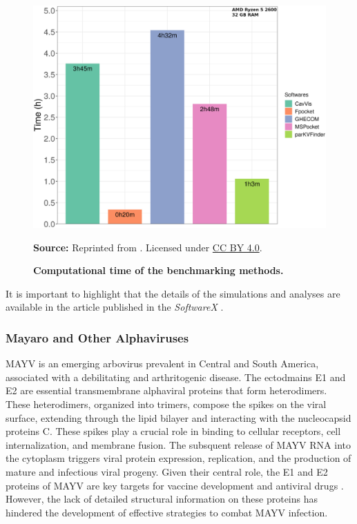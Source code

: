 \documentclass[Ingles]{phdthesis}
\begin{document}
\begin{figure}[H]
  \centerline{\includegraphics[scale=0.9]{images/hiv1-protease-dm-times.png}}
  \centerline{\tiny{\textbf{Source:} Reprinted from \cite{guerra2020}. Licensed under \href{https://creativecommons.org/licenses/by/4.0/}{CC BY 4.0}.}}
  \caption[Computational time of the benchmarking methods]{\textbf{Computational time of the benchmarking methods.}}
  \label{fig:hiv1-protease-dm-times}
\end{figure}

It is important to highlight that the details of the simulations and analyses are available in the article published in the \textit{SoftwareX} \cite{guerra2020}.

\subsubsection{Mayaro and Other Alphaviruses \label{sec:parkvfinder-mayaro}}

\ac{MAYV} is an emerging arbovirus prevalent in Central and South America, associated with a debilitating and arthritogenic disease. The ectodmains E1 and E2 are essential transmembrane alphaviral proteins that form heterodimers. These heterodimers, organized into trimers, compose the spikes on the viral surface, extending through the lipid bilayer and interacting with the nucleocapsid proteins C. These spikes play a crucial role in binding to cellular receptors, cell internalization, and membrane fusion. The subsquent release of \acs{MAYV} RNA into the cytoplasm triggers viral protein expression, replication, and the production of mature and infectious viral progeny. Given their central role, the E1 and E2 proteins of \acs{MAYV} are key targets for vaccine development and antiviral drugs \cite{ribeiro2021}. However, the lack of detailed structural information on these proteins has hindered the development of effective strategies to combat \acs{MAYV} infection.
\end{document}
